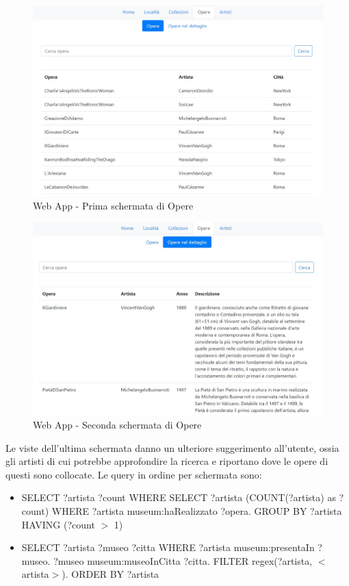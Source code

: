 \documentclass[12pt]{article}
\begin{document}
\begin{figure}[!h]
   \centering
   \includegraphics[scale=0.6]{fig/Schermata 4.1 webapp.jpg}
   \caption{Web App - Prima schermata di Opere}\label{fig:picture}
\end{figure}
\begin{figure}[!ht]
   \centering
   \includegraphics[scale=0.6]{fig/Schermata 4.2 webapp.jpg}
   \caption{Web App - Seconda schermata di Opere}\label{fig:picture}
\end{figure}

\newpage
Le viste dell’ultima schermata danno un ulteriore suggerimento all’utente, ossia gli artisti di cui potrebbe approfondire la ricerca e riportano dove le opere di questi sono collocate.
Le query in ordine per schermata sono:

\begin{itemize}
 \item SELECT ?artista ?count WHERE{ SELECT ?artista (COUNT(?artista) as ?count) WHERE { ?artista museum:haRealizzato ?opera.} } GROUP BY ?artista HAVING (?count $>$ 1)
 \item SELECT ?artista ?museo ?citta WHERE {?artista museum:presentaIn ?museo. ?museo museum:museoInCitta ?citta. FILTER regex(?artista, $<$artista$>$).} ORDER BY ?artista
\end{itemize} 
\end{document}
